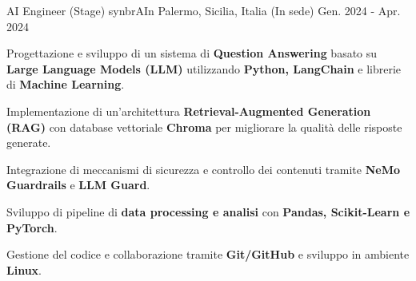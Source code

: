 \begin{cventries}
  \cventry
    {AI Engineer (Stage)}
    {synbrAIn}
    {Palermo, Sicilia, Italia (In sede)}
    {Gen. 2024 - Apr. 2024}
    {
      \begin{cvitems}
        \item {Progettazione e sviluppo di un sistema di \textbf{Question Answering} basato su \textbf{Large Language Models (LLM)} utilizzando \textbf{Python, LangChain} e librerie di \textbf{Machine Learning}.}
        \item {Implementazione di un'architettura \textbf{Retrieval-Augmented Generation (RAG)} con database vettoriale \textbf{Chroma} per migliorare la qualità delle risposte generate.}
        \item {Integrazione di meccanismi di sicurezza e controllo dei contenuti tramite \textbf{NeMo Guardrails} e \textbf{LLM Guard}.}
        \item {Sviluppo di pipeline di \textbf{data processing e analisi} con \textbf{Pandas, Scikit-Learn e PyTorch}.}
        \item {Gestione del codice e collaborazione tramite \textbf{Git/GitHub} e sviluppo in ambiente \textbf{Linux}.}
      \end{cvitems}
    }

\end{cventries}